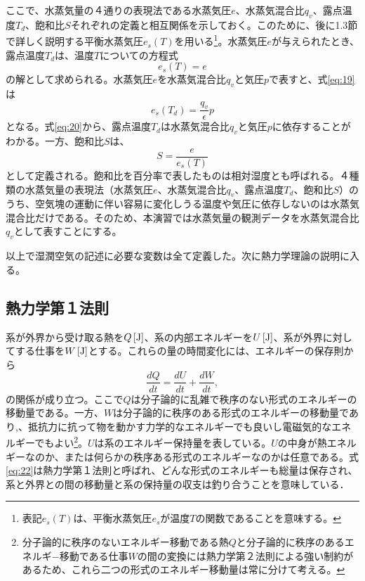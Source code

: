 \documentclass{ltjsarticle}
\begin{document}
ここで、水蒸気量の４通りの表現法である水蒸気圧$e$、水蒸気混合比$q_{v}$、露点温度$T_{d}$、飽和比$S$それぞれの定義と相互関係を示しておく。このために、後に1.3節で詳しく説明する平衡水蒸気圧$e_{s}(T)$を用いる\footnote{表記$e_{s}(T)$は、平衡水蒸気圧$e_{s}$が温度$T$の関数であることを意味する。}。水蒸気圧$e$が与えられたとき、露点温度$T_{d}$は、温度$T$についての方程式
\begin{equation}\label{eq:19}
 e_{s}(T)=e
\end{equation}
の解として求められる。水蒸気圧$e$を水蒸気混合比$q_{v}$と気圧$p$で表すと、式\eqref{eq:19}は
\begin{equation}\label{eq:20}
 e_{s}(T_{d})=\frac{q_{v}}{\epsilon}p
\end{equation}
となる。式\eqref{eq:20}から、露点温度$T_{d}$は水蒸気混合比$q_{v}$と気圧$p$に依存することがわかる。一方、飽和比$S$は、
\begin{equation}\label{eq:21}
 S=\frac{e}{e_{s}(T)}
\end{equation}
として定義される。飽和比を百分率で表したものは相対湿度とも呼ばれる。４種類の水蒸気量の表現法（水蒸気圧$e$、水蒸気混合比$q_{v}$、露点温度$T_{d}$、飽和比$S$）のうち、空気塊の運動に伴い容易に変化しうる温度や気圧に依存しないのは水蒸気混合比だけである。そのため、本演習では水蒸気量の観測データを水蒸気混合比$q_{v}$として表すことにする。

以上で湿潤空気の記述に必要な変数は全て定義した。次に熱力学理論の説明に入る。

\subsection{熱力学第１法則}
系が外界から受け取る熱を$Q\,[\rm{J}]$、系の内部エネルギーを$U\,[\rm{J}]$、系が外界に対してする仕事を$W\,[\rm{J}]$とする。これらの量の時間変化には、エネルギーの保存則から
\begin{equation}\label{eq:22}
 \frac{dQ}{dt}=\frac{dU}{dt}+\frac{dW}{dt},
\end{equation}
の関係が成り立つ。ここで$Q$は分子論的に乱雑で秩序のない形式のエネルギーの移動量である。一方、$W$は分子論的に秩序のある形式のエネルギーの移動量であり,、抵抗力に抗って物を動かす力学的なエネルギーでも良いし電磁気的なエネルギーでもよい\footnote{分子論的に秩序のないエネルギー移動である熱$Q$と分子論的に秩序のあるエネルギ−移動である仕事$W$の間の変換には熱力学第２法則による強い制約があるため、これら二つの形式のエネルギー移動量は常に分けて考える。}。$U$は系のエネルギー保持量を表している。$U$の中身が熱エネルギーなのか、または何らかの秩序ある形式のエネルギーなのかは任意である。式\eqref{eq:22}は熱力学第１法則と呼ばれ、どんな形式のエネルギーも総量は保存され、系と外界との間の移動量と系の保持量の収支は釣り合うことを意味している．
\end{document}
